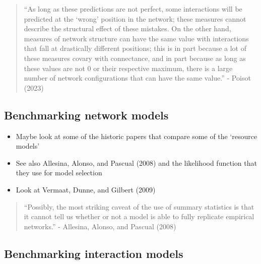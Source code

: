 \documentclass[
  letterpaper,
  DIV=11,
  numbers=noendperiod]{scrartcl}
\begin{document}
\begin{quote}
``As long as these predictions are not perfect, some interactions will
be predicted at the `wrong' position in the network; these measures
cannot describe the structural effect of these mistakes. On the other
hand, measures of network structure can have the same value with
interactions that fall at drastically different positions; this is in
part because a lot of these measures covary with connectance, and in
part because as long as these values are not 0 or their respective
maximum, there is a large number of network configurations that can have
the same value.'' - Poisot (2023)
\end{quote}

\subsection{Benchmarking network
models}\label{benchmarking-network-models}

\begin{itemize}
\item
  Maybe look at some of the historic papers that compare some of the
  `resource models'
\item
  See also Allesina, Alonso, and Pascual (2008) and the likelihood
  function that they use for model selection
\item
  Look at Vermaat, Dunne, and Gilbert (2009)
\end{itemize}

\begin{quote}
``Possibly, the most striking caveat of the use of summary statistics is
that it cannot tell us whether or not a model is able to fully replicate
empirical networks.'' - Allesina, Alonso, and Pascual (2008)
\end{quote}

\subsection{Benchmarking interaction
models}\label{benchmarking-interaction-models}
\end{document}
